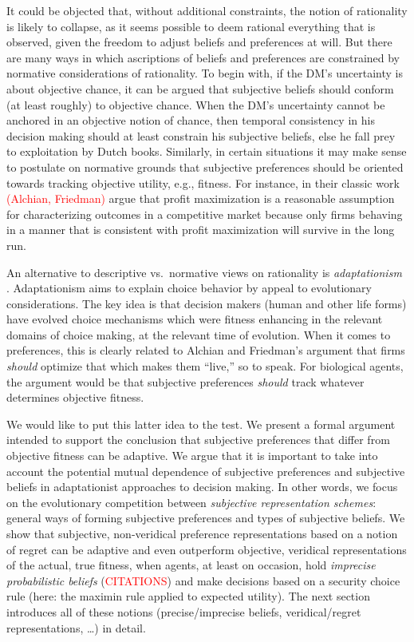 \documentclass[fleqn,reqno,11pt]{article}
\newcommand{\myalert}[1]{\textcolor{red}{#1}}
\begin{document}
It could be objected that, without additional constraints, the notion of rationality is likely
to collapse, as it seems possible to deem rational everything that is observed, given the
freedom to adjust beliefs and preferences at will. But there are many ways in which ascriptions
of beliefs and preferences are constrained by normative considerations of rationality. To begin
with, if the DM's uncertainty is about objective chance, it can be argued that subjective
beliefs should conform (at least roughly) to objective chance. When the DM's uncertainty cannot
be anchored in an objective notion of chance, then temporal consistency in his decision making
should at least constrain his subjective beliefs, else he fall prey to exploitation by Dutch
books. Similarly, in certain situations it may make sense to postulate on normative grounds
that subjective preferences should be oriented towards tracking objective utility, e.g.,
fitness. For instance, in their classic work \myalert{(Alchian, Friedman)} argue that profit
maximization is a reasonable assumption for characterizing outcomes in a competitive market
because only firms behaving in a manner that is consistent with profit maximization will
survive in the long run.

An alternative to descriptive vs.~normative views on rationality is \emph{adaptationism}
\citep[e.g.][]{HagenChater2012:Decision-Making}.  Adaptationism aims to
explain choice behavior by appeal to evolutionary considerations. The key idea is that decision
makers (human and other life forms) have evolved choice mechanisms which were fitness enhancing
in the relevant domains of choice making, at the relevant time of evolution. When it comes to
preferences, this is clearly related to Alchian and Friedman's argument that firms
\emph{should} optimize that which makes them ``live,'' so to speak. For biological agents, the
argument would be that subjective preferences \emph{should} track whatever determines objective
fitness.

We would like to put this latter idea to the test. We present a formal argument intended to
support the conclusion that subjective preferences that differ from objective fitness can be
adaptive. We argue that it is important to take into account the potential mutual dependence of
subjective preferences and subjective beliefs in adaptationist approaches to decision
making. In other words, we focus on the evolutionary competition between \emph{subjective
  representation schemes}: general ways of forming subjective preferences and types of
subjective beliefs. We show that subjective, non-veridical preference representations based on
a notion of regret \citep[e.g.][]{Savage1951:The-theory-of-s,LoomesSugden1982:Regret-Theory:-}
can be adaptive and even outperform objective, veridical representations of the actual, true
fitness, when agents, at least on occasion, hold \emph{imprecise probabilistic beliefs}
(\textcolor{red}{CITATIONS}) and make decisions based on a security choice rule (here: the
maximin rule applied to expected utility). The next section introduces all of these notions
(precise/imprecise beliefs, veridical/regret representations, \dots) in detail.
\end{document}
